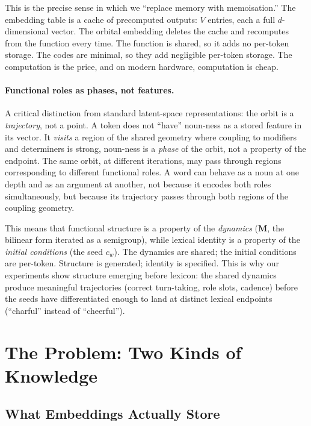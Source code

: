 \documentclass[11pt, a4paper]{article}
\newcommand{\M}{\mathbf{M}}
\theoremstyle{remark}
\begin{document}
This is the precise sense in which we ``replace memory with memoisation.''
The embedding table is a cache of precomputed outputs: $V$ entries, each a full $d$-dimensional vector.
The orbital embedding deletes the cache and recomputes from the function every time.
The function is shared, so it adds no per-token storage.
The codes are minimal, so they add negligible per-token storage.
The computation is the price, and on modern hardware, computation is cheap.

\paragraph{Functional roles as phases, not features.}
A critical distinction from standard latent-space representations: the orbit is a \emph{trajectory}, not a point.
A token does not ``have'' noun-ness as a stored feature in its vector.
It \emph{visits} a region of the shared geometry where coupling to modifiers and determiners is strong, noun-ness is a \emph{phase} of the orbit, not a property of the endpoint.
The same orbit, at different iterations, may pass through regions corresponding to different functional roles.
A word can behave as a noun at one depth and as an argument at another, not because it encodes both roles simultaneously, but because its trajectory passes through both regions of the coupling geometry.

This means that functional structure is a property of the \emph{dynamics} ($\M$, the bilinear form iterated as a semigroup), while lexical identity is a property of the \emph{initial conditions} (the seed $c_w$).
The dynamics are shared; the initial conditions are per-token.
Structure is generated; identity is specified.
This is why our experiments show structure emerging before lexicon: the shared dynamics produce meaningful trajectories (correct turn-taking, role slots, cadence) before the seeds have differentiated enough to land at distinct lexical endpoints (``charful'' instead of ``cheerful'').


\section{The Problem: Two Kinds of Knowledge}

\subsection{What Embeddings Actually Store}
\end{document}
